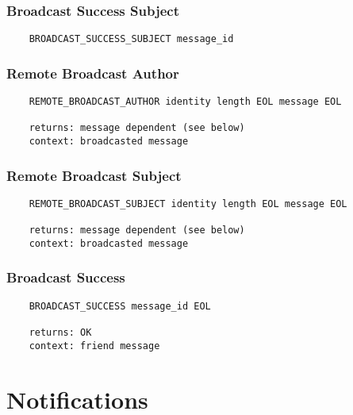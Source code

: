 \documentclass[letterpaper,11pt,oneside]{article}
\begin{document}
\subsubsection{Broadcast Success Subject}

\vspace{10pt}
\begin{verbatim}
    BROADCAST_SUCCESS_SUBJECT message_id
\end{verbatim}
\vspace{10pt}

\subsubsection{Remote Broadcast Author}

\vspace{10pt}
\begin{verbatim}
    REMOTE_BROADCAST_AUTHOR identity length EOL message EOL

    returns: message dependent (see below)
    context: broadcasted message
\end{verbatim}
\vspace{10pt}

\subsubsection{Remote Broadcast Subject}

\vspace{10pt}
\begin{verbatim}
    REMOTE_BROADCAST_SUBJECT identity length EOL message EOL

    returns: message dependent (see below)
    context: broadcasted message
\end{verbatim}
\vspace{10pt}

\subsubsection{Broadcast Success}

\vspace{10pt}
\begin{verbatim}
    BROADCAST_SUCCESS message_id EOL

    returns: OK
    context: friend message
\end{verbatim}
\vspace{10pt}

\section{Notifications}
\end{document}
